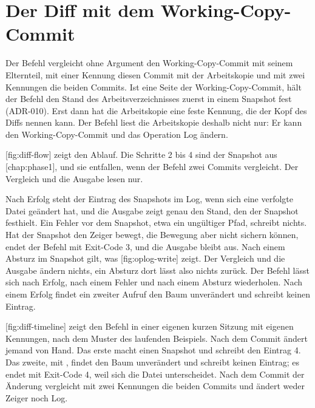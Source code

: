 \section[sec:diff-command]{Der Diff mit dem Working-Copy-Commit}

Der Befehl  vergleicht ohne Argument den Working-Copy-Commit mit seinem Elternteil,
mit einer Kennung diesen Commit mit der Arbeitskopie und mit zwei Kennungen die beiden Commits.
Ist eine Seite der Working-Copy-Commit, hält der Befehl den Stand des Arbeitsverzeichnisses
zuerst in einem Snapshot fest (ADR-010). Erst dann hat die Arbeitskopie eine feste Kennung,
die der Kopf des Diffs nennen kann. Der Befehl liest die Arbeitskopie deshalb nicht nur:
Er kann den Working-Copy-Commit und das Operation Log ändern.

[fig:diff-flow] zeigt den Ablauf. Die Schritte 2 bis 4 sind der Snapshot aus
[chap:phase1], und sie entfallen, wenn der Befehl zwei Commits vergleicht.
Der Vergleich und die Ausgabe lesen nur.

\startplacefigure[title={Ablauf von \type{diff} mit dem Working-Copy-Commit und Absturzpunkten},
    reference=fig:diff-flow,location=here]
\stopplacefigure

Nach Erfolg steht der Eintrag des Snapshots im Log, wenn sich eine verfolgte Datei geändert hat,
und die Ausgabe zeigt genau den Stand, den der Snapshot festhielt. Ein Fehler vor dem Snapshot,
etwa ein ungültiger Pfad, schreibt nichts. Hat der Snapshot den Zeiger bewegt, die Bewegung aber
nicht sichern können, endet der Befehl mit Exit-Code 3, und die Ausgabe bleibt aus.
Nach einem Absturz im Snapshot gilt, was [fig:oplog-write] zeigt. Der Vergleich
und die Ausgabe ändern nichts, ein Absturz dort lässt also nichts zurück. Der Befehl lässt sich
nach Erfolg, nach einem Fehler und nach einem Absturz wiederholen. Nach einem Erfolg findet ein
zweiter Aufruf den Baum unverändert und schreibt keinen Eintrag.

[fig:diff-timeline] zeigt den Befehl in einer eigenen kurzen Sitzung mit eigenen
Kennungen, nach dem Muster des laufenden Beispiels. Nach dem Commit  ändert
jemand  von Hand. Das erste  macht einen Snapshot und schreibt den
Eintrag 4. Das zweite, mit , findet den Baum unverändert und schreibt keinen
Eintrag; es endet mit Exit-Code 4, weil sich die Datei unterscheidet. Nach dem Commit der
Änderung vergleicht  mit zwei Kennungen die beiden Commits und ändert weder Zeiger
noch Log.

